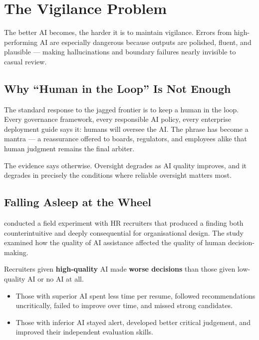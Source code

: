 \chapter{The Vigilance Problem}
\label{ch:vigilance}

\epigraph{The better AI becomes, the harder it is to maintain vigilance. Errors from high-performing AI are especially dangerous because outputs are polished, fluent, and plausible --- making hallucinations and boundary failures nearly invisible to casual review.}{}

\section{Why ``Human in the Loop'' Is Not Enough}

The standard response to the jagged frontier is to keep a human in the loop. Every governance framework, every responsible AI policy, every enterprise deployment guide says it: humans will oversee the AI. The phrase has become a mantra --- a reassurance offered to boards, regulators, and employees alike that human judgment remains the final arbiter.

The evidence says otherwise. Oversight degrades as AI quality improves, and it degrades in precisely the conditions where reliable oversight matters most.

\section{Falling Asleep at the Wheel}

\textcite{DellAcqua2023} conducted a field experiment with HR recruiters that produced a finding both counterintuitive and deeply consequential for organisational design. The study examined how the quality of AI assistance affected the quality of human decision-making.

\begin{evidencebox}[title={The Counterintuitive Finding}]
Recruiters given \textbf{high-quality} AI made \textbf{worse decisions} than those given low-quality AI or no AI at all.
\begin{itemize}
  \item Those with superior AI spent less time per resume, followed recommendations uncritically, failed to improve over time, and missed strong candidates.
  \item Those with inferior AI stayed alert, developed better critical judgement, and improved their independent evaluation skills.
\end{itemize}
\end{evidencebox}

